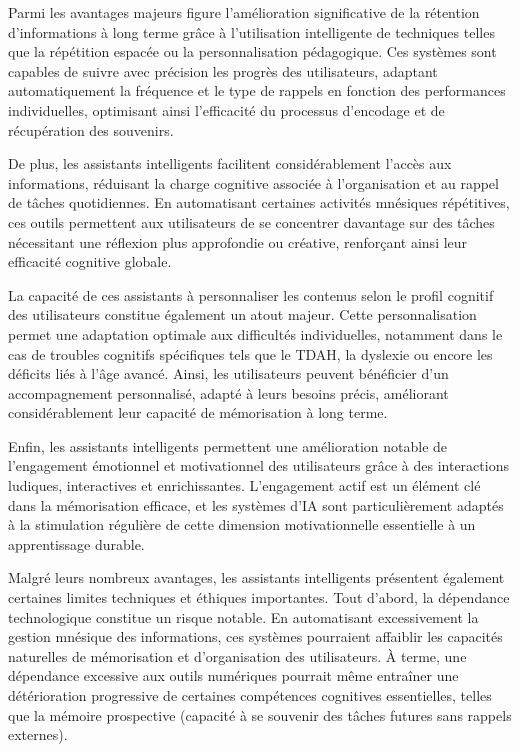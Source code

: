 \documentclass[11pt,a4paper]{report}
\begin{document}
Parmi les avantages majeurs figure l’amélioration significative de la rétention d’informations à long terme grâce à l'utilisation intelligente de techniques telles que la répétition espacée ou la personnalisation pédagogique. Ces systèmes sont capables de suivre avec précision les progrès des utilisateurs, adaptant automatiquement la fréquence et le type de rappels en fonction des performances individuelles, optimisant ainsi l’efficacité du processus d’encodage et de récupération des souvenirs.

De plus, les assistants intelligents facilitent considérablement l’accès aux informations, réduisant la charge cognitive associée à l’organisation et au rappel de tâches quotidiennes. En automatisant certaines activités mnésiques répétitives, ces outils permettent aux utilisateurs de se concentrer davantage sur des tâches nécessitant une réflexion plus approfondie ou créative, renforçant ainsi leur efficacité cognitive globale.

La capacité de ces assistants à personnaliser les contenus selon le profil cognitif des utilisateurs constitue également un atout majeur. Cette personnalisation permet une adaptation optimale aux difficultés individuelles, notamment dans le cas de troubles cognitifs spécifiques tels que le TDAH, la dyslexie ou encore les déficits liés à l’âge avancé. Ainsi, les utilisateurs peuvent bénéficier d’un accompagnement personnalisé, adapté à leurs besoins précis, améliorant considérablement leur capacité de mémorisation à long terme.

Enfin, les assistants intelligents permettent une amélioration notable de l’engagement émotionnel et motivationnel des utilisateurs grâce à des interactions ludiques, interactives et enrichissantes. L’engagement actif est un élément clé dans la mémorisation efficace, et les systèmes d’IA sont particulièrement adaptés à la stimulation régulière de cette dimension motivationnelle essentielle à un apprentissage durable.

Malgré leurs nombreux avantages, les assistants intelligents présentent également certaines limites techniques et éthiques importantes. Tout d’abord, la dépendance technologique constitue un risque notable. En automatisant excessivement la gestion mnésique des informations, ces systèmes pourraient affaiblir les capacités naturelles de mémorisation et d’organisation des utilisateurs. À terme, une dépendance excessive aux outils numériques pourrait même entraîner une détérioration progressive de certaines compétences cognitives essentielles, telles que la mémoire prospective (capacité à se souvenir des tâches futures sans rappels externes).
\end{document}
